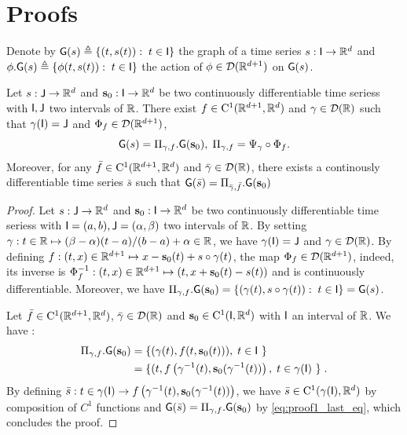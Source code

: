 \section{Proofs}
\label{appendix:proofs}
Denote by $\mathsf{G}(s)\triangleq \{ (t,s(t)): \; t\in \mathsf{I} \} $ the graph of a time series $s: \mathsf{I} \to \mathbb{R}^d$ and $ \phi.\mathsf{G}(s)\triangleq\{ \phi(t,s(t)): \; t\in \mathsf{I}\} $ the action of  $\phi\in \mathcal{D}(\mathbb{R}^{d+1}) $ on $\mathsf{G}(s)$.
\begin{theorem}
    \label{theorem:representation_proof}
Let $s:  \mathsf{J} \to \mathbb{R}^d  $ and $\mathbf{s}_0: \mathsf{I}\to \mathbb{R}^d $ be two continuously differentiable time seriess with $\mathsf{I},\mathsf{J}$ two intervals of $\mathbb{R}$.
 There exist $f\in \mathrm{C}^1(\mathbb{R}^{d+1},\mathbb{R}^d)$ and $\gamma\in  \mathcal{D}(\mathbb{R}) $ such that $\gamma(\mathsf{I})=\mathsf{J} $ and $\Phi_f\in \mathcal{D}(\mathbb{R}^{d+1})$,
 \begin{equation}%
    \msg(s)= \Pi_{\gamma,f}.\msg(\mathbf{s}_0),\eqsp \Pi_{\gamma,f}=\Psi_\gamma\circ\Phi_f.
 \end{equation}
 Moreover, for any $\bar{f}\in \mathrm{C}^1(\mathbb{R}^{d+1},\mathbb{R}^d)$ and $\bar{\gamma}\in  \mathcal{D}(\mathbb{R}) $, there exists a continously differentiable time series $\bar{s}$ such that 
 $\mathsf{G}(\bar{s})= \Pi_{\bar{\gamma},\bar{f}}.\mathsf{G}(\mathbf{s}_0)$
\end{theorem}
\begin{proof}
  Let $s:  \mathsf{J} \to \mathbb{R}^d  $ and $\mathbf{s}_0: \mathsf{I}\to \mathbb{R}^d $ be two continuously differentiable time seriess with $\mathsf{I}=(a,b),\mathsf{J}=(\alpha,\beta)$ two intervals of $\mathbb{R}$.
  By setting $\gamma: t\in \mathbb{R} \mapsto (\beta-\alpha)(t-a)/(b-a)+\alpha\in \mathbb{R} $, we have $ \gamma(\mathsf{I})=\mathsf{J}$ and $\gamma \in \mathcal{D}(\mathbb{R}) $.
   By defining $f:(t,x)\in\mathbb{R}^{d+1}\mapsto x-\mathbf{s}_0(t)+s\circ \gamma(t) $, the map $\Phi_f\in \mathcal{D}(\mathbb{R}^{d+1})$,
    indeed, its inverse is $\Phi_f^{-1}:(t,x)\in\mathbb{R}^{d+1}\mapsto (t,x+\mathbf{s}_0(t)-s(t)) $ and is continuously differentiable.
     Moreover, we have $\Pi_{\gamma,f}.\mathsf{G}(\mathbf{s}_0)=\{(\gamma(t),s\circ \gamma(t)):\; t\in\mathsf{I} \}=\mathsf{G}(s) $.

    

    Let $\bar{f}\in \mathrm{C}^1(\mathbb{R}^{d+1},\mathbb{R}^d)$, $\bar{\gamma}\in  \mathcal{D}(\mathbb{R}) $ and $\mathbf{s}_0\in \mathrm{C}^1(\mathsf{I},\mathbb{R}^d)$ with $\mathsf{I}$ an interval of $\mathbb{R}$.
    We have :
    \begin{align}
      \Pi_{\gamma,f}.\msg(\mathbf{s}_0)&=\{(\gamma(t),f(t,\mathbf{s}_0(t))),\eqsp t\in \msi \} \\
      &\label{eq:proof1_last_eq}=\{(t,f\left(\gamma^{-1}(t),\mathbf{s}_0(\gamma^{-1}(t))\right),\eqsp t\in \gamma(\msi) \} \eqsp .
    \end{align}
    By defining $\bar{s}:t\in \gamma(\mathsf{I})\to f\left(\gamma^{-1}(t),\mathbf{s}_0(\gamma^{-1}(t))\right) $, we have $\bar{s}\in \mathrm{C}^1(\gamma(\mathsf{I}), \mathbb{R}^d) $ by composition of $C^1$ functions
    and $ \mathsf{G}(\bar{s})= \Pi_{\gamma,f}.\mathsf{G}(\mathbf{s}_0)$ by \eqref{eq:proof1_last_eq}, which concludes the proof.
\end{proof}
